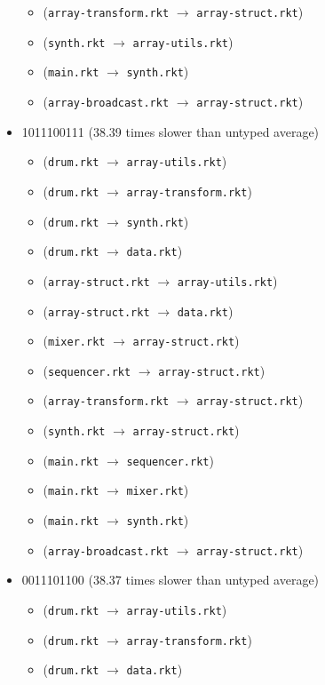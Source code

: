 \documentclass{article}
\newcommand{\mono}[1]{\texttt{#1}}
\begin{document}
\begin{itemize}
\begin{itemize}
  \item (\mono{array-transform.rkt} $\rightarrow$ \mono{array-struct.rkt})
  \item (\mono{synth.rkt} $\rightarrow$ \mono{array-utils.rkt})
  \item (\mono{main.rkt} $\rightarrow$ \mono{synth.rkt})
  \item (\mono{array-broadcast.rkt} $\rightarrow$ \mono{array-struct.rkt})
  \end{itemize}
\item 1011100111 (38.39 times slower than untyped average)
  \begin{itemize}
  \item (\mono{drum.rkt} $\rightarrow$ \mono{array-utils.rkt})
  \item (\mono{drum.rkt} $\rightarrow$ \mono{array-transform.rkt})
  \item (\mono{drum.rkt} $\rightarrow$ \mono{synth.rkt})
  \item (\mono{drum.rkt} $\rightarrow$ \mono{data.rkt})
  \item (\mono{array-struct.rkt} $\rightarrow$ \mono{array-utils.rkt})
  \item (\mono{array-struct.rkt} $\rightarrow$ \mono{data.rkt})
  \item (\mono{mixer.rkt} $\rightarrow$ \mono{array-struct.rkt})
  \item (\mono{sequencer.rkt} $\rightarrow$ \mono{array-struct.rkt})
  \item (\mono{array-transform.rkt} $\rightarrow$ \mono{array-struct.rkt})
  \item (\mono{synth.rkt} $\rightarrow$ \mono{array-struct.rkt})
  \item (\mono{main.rkt} $\rightarrow$ \mono{sequencer.rkt})
  \item (\mono{main.rkt} $\rightarrow$ \mono{mixer.rkt})
  \item (\mono{main.rkt} $\rightarrow$ \mono{synth.rkt})
  \item (\mono{array-broadcast.rkt} $\rightarrow$ \mono{array-struct.rkt})
  \end{itemize}
\item 0011101100 (38.37 times slower than untyped average)
  \begin{itemize}
  \item (\mono{drum.rkt} $\rightarrow$ \mono{array-utils.rkt})
  \item (\mono{drum.rkt} $\rightarrow$ \mono{array-transform.rkt})
  \item (\mono{drum.rkt} $\rightarrow$ \mono{data.rkt})

\end{itemize}
\end{itemize}
\end{document}
